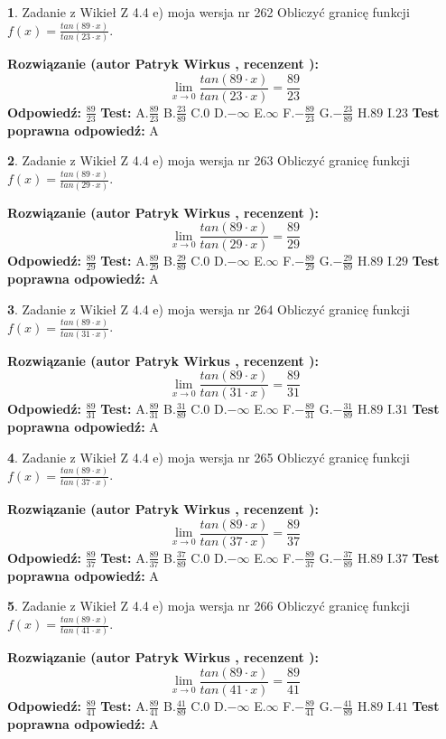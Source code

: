 \documentclass[12pt, a4paper]{article}
\theoremstyle{definition} %
\newtheorem{zad}{}
\newcommand{\zadStart}[1]{\begin{zad}#1\newline}
\newcommand{\zadStop}{\end{zad}}
\newcommand{\rozwStart}[2]{\noindent \textbf{Rozwiązanie (autor #1 , recenzent #2): }\newline}
\newcommand{\rozwStop}{\newline}
\newcommand{\odpStart}{\noindent \textbf{Odpowiedź:}\newline}
\newcommand{\odpStop}{\newline}
\newcommand{\testStart}{\noindent \textbf{Test:}\newline}
\newcommand{\testStop}{\newline}
\newcommand{\kluczStart}{\noindent \textbf{Test poprawna odpowiedź:}\newline}
\newcommand{\kluczStop}{\newline}
\begin{document}
\zadStart{Zadanie z Wikieł Z 4.4 e) moja wersja nr 262}
Obliczyć granicę funkcji $f(x)=\frac{tan(89\cdot x)}{tan(23\cdot x)}$.
\zadStop
\rozwStart{Patryk Wirkus}{}
$$\lim\limits_{x\to 0}\frac{tan(89\cdot x)}{tan(23\cdot x)}=
\frac{89}{23}$$
\rozwStop
\odpStart
$\frac{89}{23}$
\odpStop
\testStart
A.$\frac{89}{23}$
B.$\frac{23}{89}$
C.$0$
D.$-\infty$
E.$\infty$
F.$-\frac{89}{23}$
G.$-\frac{23}{89}$
H.$89$
I.$23$
\testStop
\kluczStart
A
\kluczStop



\zadStart{Zadanie z Wikieł Z 4.4 e) moja wersja nr 263}
Obliczyć granicę funkcji $f(x)=\frac{tan(89\cdot x)}{tan(29\cdot x)}$.
\zadStop
\rozwStart{Patryk Wirkus}{}
$$\lim\limits_{x\to 0}\frac{tan(89\cdot x)}{tan(29\cdot x)}=
\frac{89}{29}$$
\rozwStop
\odpStart
$\frac{89}{29}$
\odpStop
\testStart
A.$\frac{89}{29}$
B.$\frac{29}{89}$
C.$0$
D.$-\infty$
E.$\infty$
F.$-\frac{89}{29}$
G.$-\frac{29}{89}$
H.$89$
I.$29$
\testStop
\kluczStart
A
\kluczStop



\zadStart{Zadanie z Wikieł Z 4.4 e) moja wersja nr 264}
Obliczyć granicę funkcji $f(x)=\frac{tan(89\cdot x)}{tan(31\cdot x)}$.
\zadStop
\rozwStart{Patryk Wirkus}{}
$$\lim\limits_{x\to 0}\frac{tan(89\cdot x)}{tan(31\cdot x)}=
\frac{89}{31}$$
\rozwStop
\odpStart
$\frac{89}{31}$
\odpStop
\testStart
A.$\frac{89}{31}$
B.$\frac{31}{89}$
C.$0$
D.$-\infty$
E.$\infty$
F.$-\frac{89}{31}$
G.$-\frac{31}{89}$
H.$89$
I.$31$
\testStop
\kluczStart
A
\kluczStop



\zadStart{Zadanie z Wikieł Z 4.4 e) moja wersja nr 265}
Obliczyć granicę funkcji $f(x)=\frac{tan(89\cdot x)}{tan(37\cdot x)}$.
\zadStop
\rozwStart{Patryk Wirkus}{}
$$\lim\limits_{x\to 0}\frac{tan(89\cdot x)}{tan(37\cdot x)}=
\frac{89}{37}$$
\rozwStop
\odpStart
$\frac{89}{37}$
\odpStop
\testStart
A.$\frac{89}{37}$
B.$\frac{37}{89}$
C.$0$
D.$-\infty$
E.$\infty$
F.$-\frac{89}{37}$
G.$-\frac{37}{89}$
H.$89$
I.$37$
\testStop
\kluczStart
A
\kluczStop



\zadStart{Zadanie z Wikieł Z 4.4 e) moja wersja nr 266}
Obliczyć granicę funkcji $f(x)=\frac{tan(89\cdot x)}{tan(41\cdot x)}$.
\zadStop
\rozwStart{Patryk Wirkus}{}
$$\lim\limits_{x\to 0}\frac{tan(89\cdot x)}{tan(41\cdot x)}=
\frac{89}{41}$$
\rozwStop
\odpStart
$\frac{89}{41}$
\odpStop
\testStart
A.$\frac{89}{41}$
B.$\frac{41}{89}$
C.$0$
D.$-\infty$
E.$\infty$
F.$-\frac{89}{41}$
G.$-\frac{41}{89}$
H.$89$
I.$41$
\testStop
\kluczStart
A
\kluczStop
\end{document}
